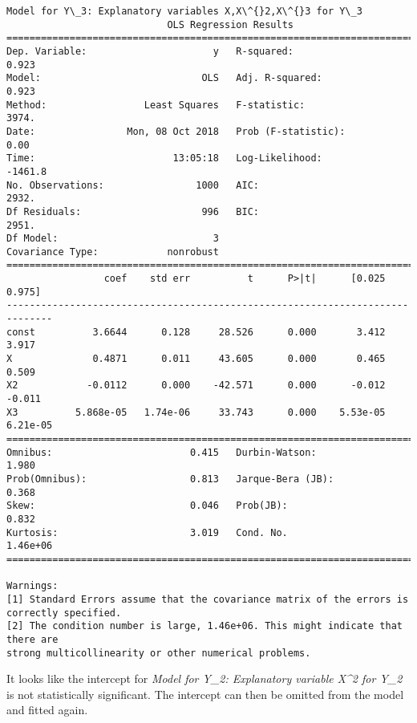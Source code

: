 \documentclass[11pt]{article}
\begin{document}
\begin{Verbatim}[commandchars=\\\{\}]
Model for Y\_3: Explanatory variables X,X\^{}2,X\^{}3 for Y\_3
                            OLS Regression Results                            
==============================================================================
Dep. Variable:                      y   R-squared:                       0.923
Model:                            OLS   Adj. R-squared:                  0.923
Method:                 Least Squares   F-statistic:                     3974.
Date:                Mon, 08 Oct 2018   Prob (F-statistic):               0.00
Time:                        13:05:18   Log-Likelihood:                -1461.8
No. Observations:                1000   AIC:                             2932.
Df Residuals:                     996   BIC:                             2951.
Df Model:                           3                                         
Covariance Type:            nonrobust                                         
==============================================================================
                 coef    std err          t      P>|t|      [0.025      0.975]
------------------------------------------------------------------------------
const          3.6644      0.128     28.526      0.000       3.412       3.917
X              0.4871      0.011     43.605      0.000       0.465       0.509
X2            -0.0112      0.000    -42.571      0.000      -0.012      -0.011
X3          5.868e-05   1.74e-06     33.743      0.000    5.53e-05    6.21e-05
==============================================================================
Omnibus:                        0.415   Durbin-Watson:                   1.980
Prob(Omnibus):                  0.813   Jarque-Bera (JB):                0.368
Skew:                           0.046   Prob(JB):                        0.832
Kurtosis:                       3.019   Cond. No.                     1.46e+06
==============================================================================

Warnings:
[1] Standard Errors assume that the covariance matrix of the errors is correctly specified.
[2] The condition number is large, 1.46e+06. This might indicate that there are
strong multicollinearity or other numerical problems.

    \end{Verbatim}

    It looks like the intercept for \emph{Model for Y\_2: Explanatory
variable X\^{}2 for Y\_2} is not statistically significant. The
intercept can then be omitted from the model and fitted again.
\end{document}
